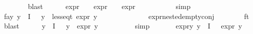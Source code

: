 \begin{isabellebody}
\ \ \ \ \ \ \isamarkupfalse%
\ blast\isanewline
\ \ \ \ \isamarkupfalse%
\ {\isachardoublequoteopen}expr{\isacharunderscore}{\kern0pt}{}\ {\isasympsi}\ {\isasymle}\ {}{\isachardoublequoteclose}\ {\isachardoublequoteopen}expr{\isacharunderscore}{\kern0pt}{}\ {\isasympsi}\ {\isasymle}\ {}{\isachardoublequoteclose}\ {\isachardoublequoteopen}expr{\isacharunderscore}{\kern0pt}{}\ {\isasympsi}\ {\isasymle}\ {}{\isachardoublequoteclose}\isanewline
\ \ \ \ \ \ \isamarkupfalse%
\ simp{\isacharplus}{\kern0pt}\isanewline
\ \ \ \ \isamarkupfalse%
\ fa{\isacharunderscore}{\kern0pt}y{\isacharcolon}{\kern0pt}\ {\isachardoublequoteopen}{\isacharparenleft}{\kern0pt}{\isasymforall}y{\isasymin}{\isasymPhi}\ {\isacharbackquote}{\kern0pt}\ I{\isachardot}{\kern0pt}\ {\isasympsi}\ {\isasymnoteq}\ y\ {\isasymlongrightarrow}\ less{\isacharunderscore}{\kern0pt}eq{\isacharunderscore}{\kern0pt}t\ {\isacharparenleft}{\kern0pt}expr\ y{\isacharparenright}{\kern0pt}\ {\isacharparenleft}{\kern0pt}{}{\isacharcomma}{\kern0pt}\ {\isasyminfinity}{\isacharcomma}{\kern0pt}\ {}{\isacharcomma}{\kern0pt}\ {}{\isacharcomma}{\kern0pt}\ {}{\isacharcomma}{\kern0pt}\ {}{\isacharparenright}{\kern0pt}{\isacharparenright}{\kern0pt}{\isachardoublequoteclose}\isanewline
\ \ \ \ \ \ \isamarkupfalse%
\ expr{\isacharunderscore}{\kern0pt}nested{\isacharunderscore}{\kern0pt}empty{\isacharunderscore}{\kern0pt}conj\isanewline
\ \ \ \ \ \ \isamarkupfalse%
\ {\isasympsi}{\isacharunderscore}{\kern0pt}ft{\isacharparenleft}{\kern0pt}{}{\isacharparenright}{\kern0pt}\ \isamarkupfalse%
\ blast\isanewline
\ \ \ \ \isamarkupfalse%
\ {\isachardoublequoteopen}{\isacharparenleft}{\kern0pt}{\isasymforall}y{\isasymin}{\isasymPhi}\ {\isacharbackquote}{\kern0pt}\ I{\isachardot}{\kern0pt}\ {\isasympsi}\ {\isasymnoteq}\ y\ {\isasymlongrightarrow}\ expr{\isacharunderscore}{\kern0pt}{}\ y\ {\isasymle}\ {}{\isacharparenright}{\kern0pt}{\isachardoublequoteclose}\isanewline
\ \ \ \ \ \ \isamarkupfalse%
\ simp\ \isanewline
\ \ \ \ \isamarkupfalse%
\ expr{\isacharunderscore}{\kern0pt}{}{\isacharunderscore}{\kern0pt}y\ {\isacharcolon}{\kern0pt}{\isachardoublequoteopen}{\isacharparenleft}{\kern0pt}{\isasymforall}y{\isasymin}{\isacharparenleft}{\kern0pt}{\isasymPhi}\ {\isacharbackquote}{\kern0pt}\ I{\isacharparenright}{\kern0pt}\ {\isacharminus}{\kern0pt}\ {\isacharbraceleft}{\kern0pt}{\isasympsi}{\isacharbraceright}{\kern0pt}{\isachardot}{\kern0pt}\ expr{\isacharunderscore}{\kern0pt}{}\ y\ {\isasymle}\ {}{\isacharparenright}{\kern0pt}{\isachardoublequoteclose}\isanewline

\end{isabellebody}
